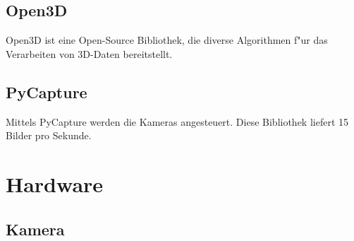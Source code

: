 \subsection{Open3D}
\label{sec:open3d}

Open3D ist eine Open-Source Bibliothek, die diverse Algorithmen f"ur das Verarbeiten von 3D-Daten bereitstellt.

\subsection{PyCapture}
\label{sec:pycapture}

Mittels PyCapture werden die Kameras angesteuert. Diese Bibliothek liefert 15 Bilder pro Sekunde.

\section{Hardware}
\label{sec:hardware}

\subsection{Kamera}
\label{sec:kamera}

